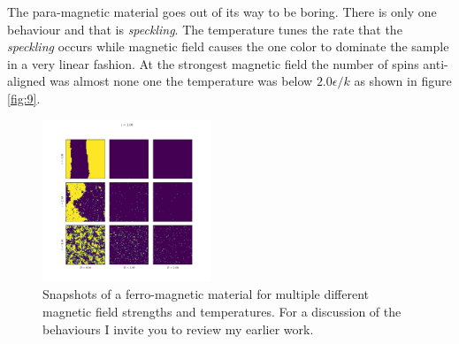 \documentclass[a4paper, twocolumn]{article}
\begin{document}
The para-magnetic material goes out of its way to be boring. There is only %
one behaviour and that is \emph{speckling}. The temperature tunes the %
rate that the \emph{speckling} occurs while magnetic field causes the %
one color to dominate the sample in a very linear fashion. At the strongest %
magnetic field the number of spins anti-aligned was almost none one %
the temperature was below \(2.0 \epsilon / k\) as shown in figure \ref{fig:9}.


\begin{figure}[h]
    \centering
    \includegraphics[width=0.45\textwidth]{pub/figures/external_field_epsilon_one.pdf}
    \caption{Snapshots of a ferro-magnetic material for multiple %
        different magnetic field strengths and temperatures. For a %
        discussion of the behaviours I invite you to review my earlier %
        work.}
    \label{fig:10}
\end{figure}
\end{document}
